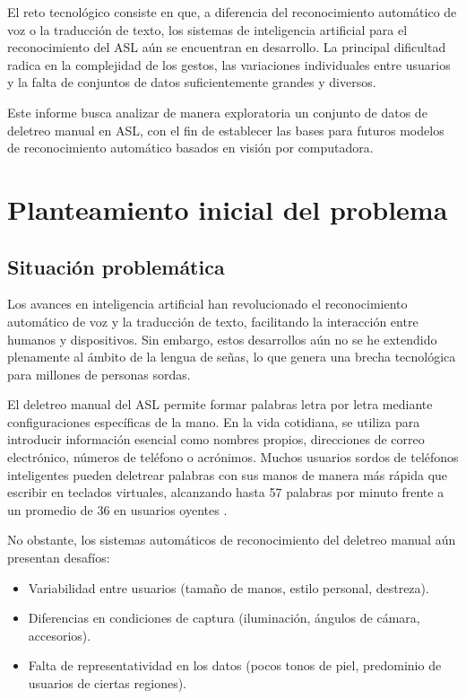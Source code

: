 \documentclass[12pt]{article}
\begin{document}
El reto tecnológico consiste en que, a diferencia del reconocimiento automático de voz o la traducción de texto, los sistemas de inteligencia artificial para el reconocimiento del ASL aún se encuentran en desarrollo. La principal dificultad radica en la complejidad de los gestos, las variaciones individuales entre usuarios y la falta de conjuntos de datos suficientemente grandes y diversos.  

Este informe busca analizar de manera exploratoria un conjunto de datos de deletreo manual en ASL, con el fin de establecer las bases para futuros modelos de reconocimiento automático basados en visión por computadora.

\section{Planteamiento inicial del problema}

\subsection{Situación problemática}
Los avances en inteligencia artificial han revolucionado el reconocimiento automático de voz y la traducción de texto, facilitando la interacción entre humanos y dispositivos. Sin embargo, estos desarrollos aún no se he extendido plenamente al ámbito de la lengua de señas, lo que genera una brecha tecnológica para millones de personas sordas.  

El deletreo manual del ASL permite formar palabras letra por letra mediante configuraciones específicas de la mano. En la vida cotidiana, se utiliza para introducir información esencial como nombres propios, direcciones de correo electrónico, números de teléfono o acrónimos. Muchos usuarios sordos de teléfonos inteligentes pueden deletrear palabras con sus manos de manera más rápida que escribir en teclados virtuales, alcanzando hasta 57 palabras por minuto frente a un promedio de 36 en usuarios oyentes \cite{asl_speed}.  

No obstante, los sistemas automáticos de reconocimiento del deletreo manual aún presentan desafíos:  
\begin{itemize}
    \item Variabilidad entre usuarios (tamaño de manos, estilo personal, destreza).  
    \item Diferencias en condiciones de captura (iluminación, ángulos de cámara, accesorios).  
    \item Falta de representatividad en los datos (pocos tonos de piel, predominio de usuarios de ciertas regiones).  
\end{itemize}
\end{document}
